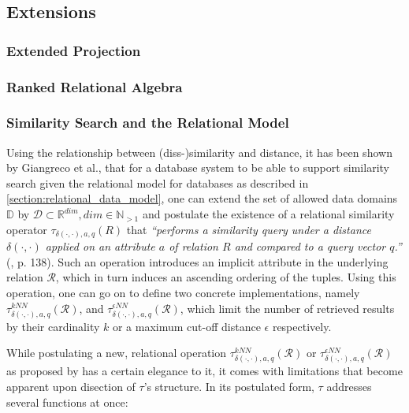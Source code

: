 \subsection{Extensions}

\subsubsection{Extended Projection}

\subsubsection{Ranked Relational Algebra}

\subsubsection{Similarity Search and the Relational Model}

Using the relationship between (diss-)similarity and distance, it has been shown by Giangreco et al., that for a database system to be able to support similarity search given the relational model for databases as described in \cref{section:relational_data_model}, one can extend the set of allowed data domains $\mathbb{D}$ by $\mathcal{D} \subset \mathbb{R}^{dim}, dim \in \mathbb{N}_{>1}$ and postulate the existence of a relational similarity operator $\tau_{\delta(\cdot,\cdot),a,q}(R)$ that \emph{``performs a similarity query under a distance $\delta(\cdot,\cdot)$ applied on an attribute $a$ of relation $R$ and compared to a query vector $q$.''} (\cite{Giangreco:2018thesis}, p. 138). Such an operation introduces an implicit attribute in the underlying relation $\mathcal{R}$, which in turn induces an ascending ordering of the tuples. Using this operation, one can go on to define two concrete implementations, namely $\tau^{kNN}_{\delta(\cdot,\cdot),a,q}(\mathcal{R})$, and $\tau^{\epsilon NN}_{\delta(\cdot,\cdot),a,q}(\mathcal{R})$, which limit the number of retrieved results by their cardinality $k$ or a maximum cut-off distance $\epsilon$ respectively.

While postulating a new, relational operation $\tau^{kNN}_{\delta(\cdot,\cdot),a,q}(\mathcal{R})$ or $\tau^{\epsilon NN}_{\delta(\cdot,\cdot),a,q}(\mathcal{R})$ as proposed by \cite{Giangreco:2018thesis} has a certain elegance to it, it  comes with limitations that become apparent upon disection of $\tau$'s structure. In its postulated form, $\tau$ addresses several functions at once:

